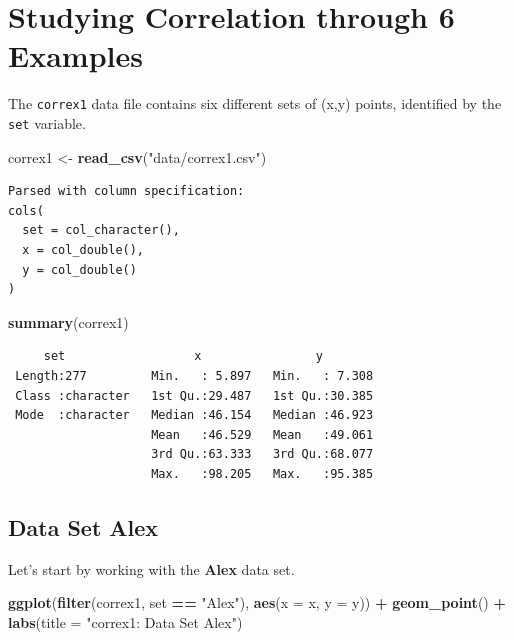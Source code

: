 \documentclass[
]{book}
\newenvironment{Shaded}{\begin{snugshade}}{\end{snugshade}}
\newcommand{\DataTypeTok}[1]{\textcolor[rgb]{0.13,0.29,0.53}{#1}}
\newcommand{\KeywordTok}[1]{\textcolor[rgb]{0.13,0.29,0.53}{\textbf{#1}}}
\newcommand{\NormalTok}[1]{#1}
\newcommand{\OperatorTok}[1]{\textcolor[rgb]{0.81,0.36,0.00}{\textbf{#1}}}
\newcommand{\StringTok}[1]{\textcolor[rgb]{0.31,0.60,0.02}{#1}}
\begin{document}
\hypertarget{studying-correlation-through-6-examples}{%
\section{Studying Correlation through 6 Examples}\label{studying-correlation-through-6-examples}}

The \texttt{correx1} data file contains six different sets of (x,y) points, identified by the \texttt{set} variable.

\begin{Shaded}
\begin{Highlighting}[]
\NormalTok{correx1 <-}\StringTok{ }\KeywordTok{read_csv}\NormalTok{(}\StringTok{"data/correx1.csv"}\NormalTok{) }
\end{Highlighting}
\end{Shaded}

\begin{verbatim}
Parsed with column specification:
cols(
  set = col_character(),
  x = col_double(),
  y = col_double()
)
\end{verbatim}

\begin{Shaded}
\begin{Highlighting}[]
\KeywordTok{summary}\NormalTok{(correx1)}
\end{Highlighting}
\end{Shaded}

\begin{verbatim}
     set                  x                y         
 Length:277         Min.   : 5.897   Min.   : 7.308  
 Class :character   1st Qu.:29.487   1st Qu.:30.385  
 Mode  :character   Median :46.154   Median :46.923  
                    Mean   :46.529   Mean   :49.061  
                    3rd Qu.:63.333   3rd Qu.:68.077  
                    Max.   :98.205   Max.   :95.385  
\end{verbatim}

\hypertarget{data-set-alex}{%
\subsection{Data Set Alex}\label{data-set-alex}}

Let's start by working with the \textbf{Alex} data set.

\begin{Shaded}
\begin{Highlighting}[]
\KeywordTok{ggplot}\NormalTok{(}\KeywordTok{filter}\NormalTok{(correx1, set }\OperatorTok{==}\StringTok{ "Alex"}\NormalTok{), }\KeywordTok{aes}\NormalTok{(}\DataTypeTok{x =}\NormalTok{ x, }\DataTypeTok{y =}\NormalTok{ y)) }\OperatorTok{+}\StringTok{ }
\StringTok{    }\KeywordTok{geom_point}\NormalTok{() }\OperatorTok{+}
\StringTok{    }\KeywordTok{labs}\NormalTok{(}\DataTypeTok{title =} \StringTok{"correx1: Data Set Alex"}\NormalTok{)}
\end{Highlighting}
\end{Shaded}
\end{document}
